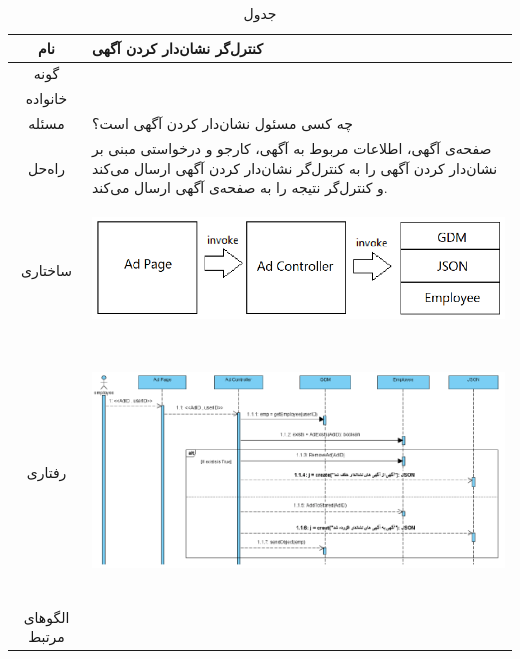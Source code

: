 \begin{table}[H]
	\begin{adjustbox}{width=\textwidth}
		\begin{tabular}{|c|p{\textwidth}|}
			\hline
			نام &
			کنترل‌گر نشان‌دار کردن آگهی \\ 
			\hline
			گونه & 
			\grasp \\
			\hline
			خانواده &
			\controller \\
			\hline
			مسئله & 
			چه کسی مسئول نشان‌دار کردن آگهی است؟\\
			\hline
			راه‌حل& 
			صفحه‌ی آگهی، اطلاعات مربوط به آگهی، کارجو و درخواستی مبنی بر نشان‌دار کردن آگهی را به کنترل‌گر نشان‌دار کردن آگهی ارسال می‌کند و کنترل‌گر نتیجه را به صفحه‌ی آگهی ارسال می‌کند. \\
			\hline
			ساختاری & 
			\begin{minipage}{\textwidth}
				\begin{flushleft}
					\begin{minipage}{\textwidth}
						\includegraphics[width=13cm, height=2.7cm]{./images/7-4-1}
					\end{minipage}
				\end{flushleft}
			\end{minipage}
			
			\\
			\hline
			رفتاری & 
			\begin{minipage}{\textwidth}
				\begin{flushleft}
					\begin{minipage}{\textwidth}
						\includegraphics[width=13.5cm, height=6cm]{./images/7-4-2}
					\end{minipage}
				\end{flushleft}
			\end{minipage}
			\\
			\hline
			الگو‌های مرتبط& \\
			\hline
		\end{tabular}
	\end{adjustbox}
	\caption{جدول }
	\label{table-with-pic:4}
\end{table}

